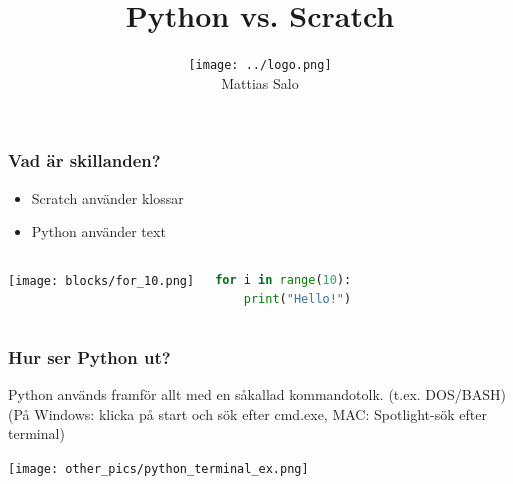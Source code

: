 \documentclass{beamer}
\author[Mattias Salo]{\texttt{[image: ../logo.png]}\\Mattias Salo}
\title{Python vs. Scratch}
\institute{CoderDojo Linköping}
\begin{document}
\begin{frame}
\maketitle
\end{frame}


\begin{frame}[fragile]
	\frametitle{Vad är skillanden?}

	\begin{itemize}
		\item{Scratch använder klossar}
		\item{Python använder text}
	\end{itemize}
	\begin{columns}[c] %
    \begin{center}
     \texttt{[image: blocks/for\_10.png]}
     \end{center}
\begin{lstlisting}[language=Python]
for i in range(10):
    print("Hello!")
\end{lstlisting}
    \end{columns}
\end{frame}

\begin{frame}
	\frametitle{Hur ser Python ut?}
	Python används framför allt med en såkallad kommandotolk. (t.ex. DOS/BASH)
	(På Windows: klicka på start och sök efter cmd.exe, MAC: Spotlight-sök efter terminal)\\
	\begin{center}
	\texttt{[image: other\_pics/python\_terminal\_ex.png]}
	\end{center}
\end{frame}
\end{document}
